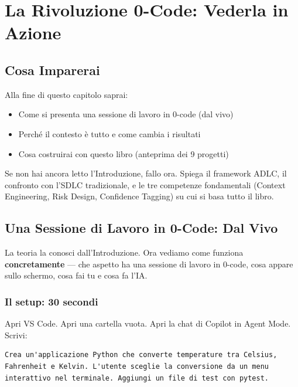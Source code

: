 \chapter{La Rivoluzione 0-Code: Vederla in Azione}

\section*{Cosa Imparerai}

Alla fine di questo capitolo saprai:
\begin{itemize}
  \item Come si presenta una sessione di lavoro in 0-code (dal vivo)
  \item Perché il contesto è tutto e come cambia i risultati
  \item Cosa costruirai con questo libro (anteprima dei 9 progetti)
\end{itemize}

\begin{notebox}
Se non hai ancora letto l'Introduzione, fallo ora. Spiega il framework ADLC, il confronto con l'SDLC tradizionale, e le tre competenze fondamentali (Context Engineering, Risk Design, Confidence Tagging) su cui si basa tutto il libro.
\end{notebox}

\section{Una Sessione di Lavoro in 0-Code: Dal Vivo}

La teoria la conosci dall'Introduzione. Ora vediamo come funziona \textbf{concretamente} --- che aspetto ha una sessione di lavoro in 0-code, cosa appare sullo schermo, cosa fai tu e cosa fa l'IA.

\subsection{Il setup: 30 secondi}

Apri VS Code. Apri una cartella vuota. Apri la chat di Copilot in Agent Mode. Scrivi:

\begin{lstlisting}
Crea un'applicazione Python che converte temperature tra Celsius,
Fahrenheit e Kelvin. L'utente sceglie la conversione da un menu
interattivo nel terminale. Aggiungi un file di test con pytest.
\end{lstlisting}

